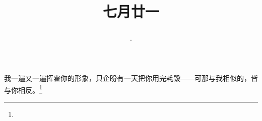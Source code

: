 \title{\date[d=24,m=8,y=2024][year:cn-y,年,month:cn,day:cn,日,·,weekday]·七月廿一 }
我一遍又一遍挥霍你的形象，只企盼有一天把你用完耗毁——可那与我相似的，皆与你相反。\footnote{ }

